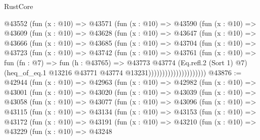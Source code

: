 \begin{lexlean}{RustCore}
\begin{coremodule}
                  @43552
                    (fun (x : @10) =>
                    @43571
                      (fun (x : @10) =>
                      @43590
                        (fun (x : @10) =>
                        @43609
                          (fun (x : @10) =>
                          @43628
                            (fun (x : @10) =>
                            @43647
                              (fun (x : @10) =>
                              @43666
                                (fun (x : @10) =>
                                @43685
                                  (fun (x : @10) =>
                                  @43704
                                    (fun (x : @10) =>
                                    @43723
                                      (fun (x : @10) =>
                                      @43742
                                        (fun (x : @10) =>
                                        @43761
                                          (fun (x : @10) =>
                                          fun (fn : @7) =>
                                          fun (h : @43765) =>
                                          @43773
                                            @43774
                                            (Eq.refl.{2} (Sort 1) @7)
                                            (heq_of_eq.{1}
                                              @13216
                                              @43771
                                              @43774
                                              @13231)))))))))))))))))))))
@43876 := @42944
    (fun (x : @10) =>
    @42963
      (fun (x : @10) =>
      @42982
        (fun (x : @10) =>
        @43001
          (fun (x : @10) =>
          @43020
            (fun (x : @10) =>
            @43039
              (fun (x : @10) =>
              @43058
                (fun (x : @10) =>
                @43077
                  (fun (x : @10) =>
                  @43096
                    (fun (x : @10) =>
                    @43115
                      (fun (x : @10) =>
                      @43134
                        (fun (x : @10) =>
                        @43153
                          (fun (x : @10) =>
                          @43172
                            (fun (x : @10) =>
                            @43191
                              (fun (x : @10) =>
                              @43210
                                (fun (x : @10) =>
                                @43229
                                  (fun (x : @10) =>
                                  @43248

\end{coremodule}
\end{lexlean}
